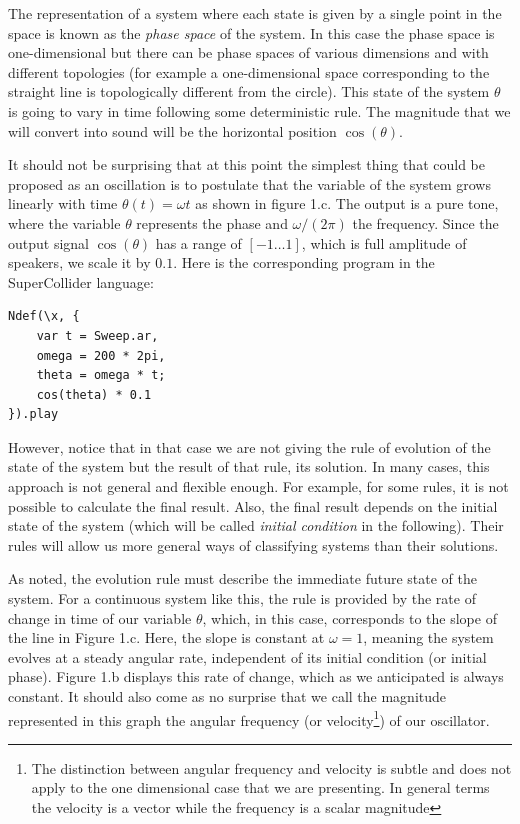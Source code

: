 \documentclass{article}
\begin{document}
The representation of a system where each state is given by a single point in the space is known as the {\em phase space} of the system. In this case the phase space is one-dimensional but there can be phase spaces of various dimensions and with different topologies (for example a one-dimensional space corresponding to the straight line is topologically different from the circle).
This state of the system $\theta$ is going to vary in time following some deterministic rule. The magnitude that we will convert into sound will be the horizontal position $\cos(\theta)$.

It should not be surprising that at this point the simplest thing that could be proposed as an oscillation is to postulate that the variable of the system grows linearly with time $\theta(t)=\omega t$ as shown in figure 1.c.  The output is a pure tone, where the variable $\theta$ represents the phase and $\omega/(2\pi)$ the frequency. Since the output signal $\cos(\theta)$ has a range of $[-1…1]$, which is full amplitude of speakers, we scale it by $0.1$. Here is the corresponding program in the SuperCollider language:


\begin{lstlisting}[frame=single,caption=A pure tone from time $t$]
Ndef(\x, { 
    var t = Sweep.ar, 
    omega = 200 * 2pi, 
    theta = omega * t; 
    cos(theta) * 0.1 
}).play
\end{lstlisting}


However, notice that in that case we are not giving the rule of evolution of the state of the system but the result of that rule, its solution. 
In many cases, this approach is not general and flexible enough. 
For example, for some rules, it is not possible to calculate the final result. 
Also, the final result depends on the initial state of the system (which will be called {\em initial condition} in the following). Their rules will allow us more general ways of classifying systems than their solutions.

As noted, the evolution rule must describe the immediate future state of the system. 
For a continuous system like this, the rule is provided by the rate of change in time of our variable $\theta$, which, in this case, corresponds to the slope of the line in Figure 1.c. 
Here, the slope is constant at $\omega=1$, meaning the system evolves at a steady angular rate, independent of its initial condition (or initial phase). Figure 1.b displays this rate of change, which as we anticipated is always constant. 
It should also come as no surprise that we call the magnitude represented in this graph the angular frequency (or velocity\footnote{The distinction between angular frequency and velocity is subtle and does not apply to the one dimensional case that we are presenting. In general terms the velocity is a vector while the frequency is a scalar magnitude}) of our oscillator.
\end{document}
